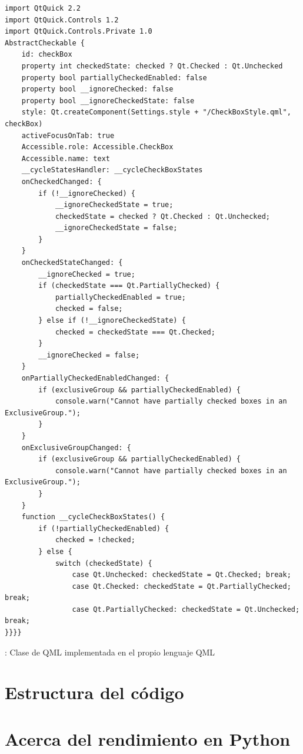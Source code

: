 \begin{listing}[phtb]
\begin{verbatim}
import QtQuick 2.2
import QtQuick.Controls 1.2
import QtQuick.Controls.Private 1.0
AbstractCheckable {
    id: checkBox
    property int checkedState: checked ? Qt.Checked : Qt.Unchecked
    property bool partiallyCheckedEnabled: false
    property bool __ignoreChecked: false
    property bool __ignoreCheckedState: false
    style: Qt.createComponent(Settings.style + "/CheckBoxStyle.qml", checkBox)
    activeFocusOnTab: true
    Accessible.role: Accessible.CheckBox
    Accessible.name: text
    __cycleStatesHandler: __cycleCheckBoxStates
    onCheckedChanged: {
        if (!__ignoreChecked) {
            __ignoreCheckedState = true;
            checkedState = checked ? Qt.Checked : Qt.Unchecked;
            __ignoreCheckedState = false;
        }
    }
    onCheckedStateChanged: {
        __ignoreChecked = true;
        if (checkedState === Qt.PartiallyChecked) {
            partiallyCheckedEnabled = true;
            checked = false;
        } else if (!__ignoreCheckedState) {
            checked = checkedState === Qt.Checked;
        }
        __ignoreChecked = false;
    }
    onPartiallyCheckedEnabledChanged: {
        if (exclusiveGroup && partiallyCheckedEnabled) {
            console.warn("Cannot have partially checked boxes in an ExclusiveGroup.");
        }
    }
    onExclusiveGroupChanged: {
        if (exclusiveGroup && partiallyCheckedEnabled) {
            console.warn("Cannot have partially checked boxes in an ExclusiveGroup.");
        }
    }
    function __cycleCheckBoxStates() {
        if (!partiallyCheckedEnabled) {
            checked = !checked;
        } else {
            switch (checkedState) {
                case Qt.Unchecked: checkedState = Qt.Checked; break;
                case Qt.Checked: checkedState = Qt.PartiallyChecked; break;
                case Qt.PartiallyChecked: checkedState = Qt.Unchecked; break;
}}}}
\end{verbatim}
\caption{: Clase de QML  implementada en el propio lenguaje QML}
\label{lst:qml-checkbox}
\end{listing}

\FloatBarrier
\section{Estructura del código}



\FloatBarrier
\section{Acerca del rendimiento en Python}

